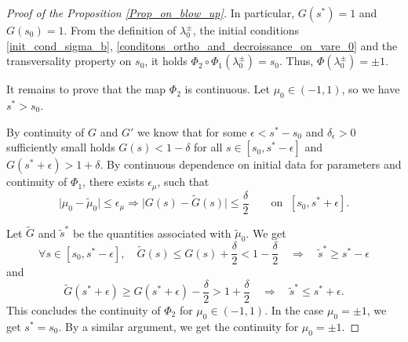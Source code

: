 \documentclass[10pt,a4paper]{amsart}
\renewcommand{\tilde}{\widetilde}
\begin{document}
\begin{proof}[Proof of the Proposition \ref{Prop_on_blow_up}]
In particular, $G(s^*) = 1$ and $G(s_0) = 1$. From the definition of $\lambda^{\pm}_0$, the initial conditions \eqref{init_cond_sigma_b}, \eqref{conditons_ortho_and_decroissance_on_vare_0} and the transversality property on $s_0$, it holds $\Phi_2 \circ \Phi_1 (\lambda^{\pm}_0) = s_0$. Thus, $\Phi(\lambda^{\pm}_0)= \pm1$.


It remains to prove that the map $\Phi_2$ is continuous. Let $\mu_0\in (-1,1)$, so we have $s^* > s_0$. 

By continuity of $G$ and $G'$ we know that for some $\epsilon <s^*-s_0$ and $\delta_\epsilon>0$ sufficiently small holds $G(s)<1-\delta$ for all $s \in [s_0,s^*-\epsilon]$ and $G(s^*+\epsilon)> 1+\delta$. 
By continuous dependence on initial data for parameters and continuity of $\Phi_1$, there exists $\epsilon_\mu$, such that 
\begin{equation}
    \lvert \mu_0 - \tilde{\mu}_0\rvert\leq \epsilon_\mu \Rightarrow \lvert G(s) - \tilde{G}(s) \rvert \leq \frac{\delta}{2} \qquad 
    \text{on }\;[s_0,s^*+\epsilon].
\end{equation}

Let $\tilde{G}$ and $\tilde{s}^*$ be the quantities associated with $\tilde{\mu}_0$. 
We get 
\begin{equation*}
    \forall s \in [s_0,s^*-\epsilon], \quad  \tilde{G}(s) \leq G(s)+\frac{\delta}{2} < 1-\frac{\delta}{2} \quad\Rightarrow\quad \tilde{s}^* \geq s^*-\epsilon
\end{equation*}
and
\begin{equation*}
    \tilde{G}(s^*+\epsilon)\geq G(s^*+\epsilon)-\frac{\delta}{2} >1+\frac{\delta}{2} \quad\Rightarrow\quad \tilde{s}^* \leq s^*+\epsilon.
\end{equation*}
This concludes the continuity of $\Phi_2$ for $\mu_0 \in (-1,1)$. In the case $\mu_0 = \pm1$, we get $s^* = s_0$. By a similar argument, we get the continuity for $\mu_0 = \pm1$.
\end{proof}
\end{document}
